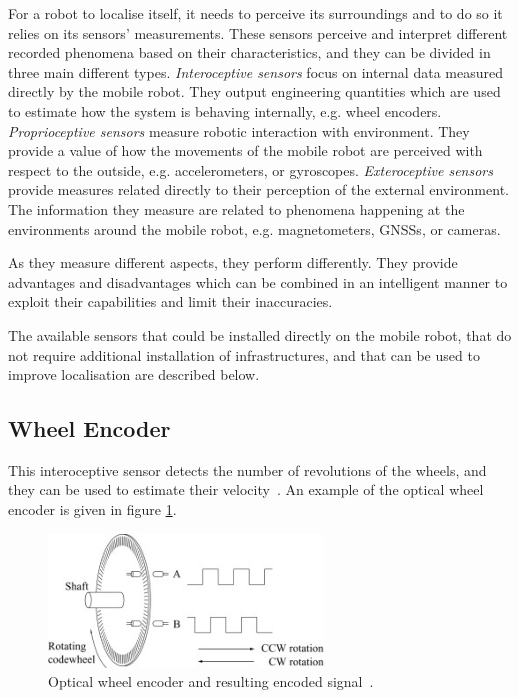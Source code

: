\noindent For a robot to localise itself, it needs to perceive its surroundings and to do so it relies on its sensors' measurements.
These sensors perceive and interpret different recorded phenomena based on their characteristics, and they can be divided in three main different types.
\textit{Interoceptive sensors} focus on internal data measured directly by the mobile robot. They output engineering quantities which are used to estimate how the system is behaving internally, e.g. wheel encoders.
\textit{Proprioceptive sensors} measure robotic interaction with environment. They provide a value of how the movements of the mobile robot are perceived with respect to the outside, e.g. accelerometers, or gyroscopes.
\textit{Exteroceptive sensors} provide measures related directly to their perception of the external environment. The information they measure are related to phenomena happening at the environments around the mobile robot, e.g. magnetometers, \glspl{GNSS}, or cameras.

As they measure different aspects, they perform differently.
They provide advantages and disadvantages which can be combined in an intelligent manner to exploit their capabilities and limit their inaccuracies.

The available sensors that could be installed directly on the mobile robot, that do not require additional installation of infrastructures, and that can be used to improve localisation are described below.

\subsection{Wheel Encoder}

\noindent This interoceptive sensor detects the number of revolutions of the wheels, and they can be used to estimate their velocity~\cite{encoder}. An example of the optical wheel encoder is given in figure \ref{fig:encoder}.
\begin{figure}[!ht]
  \begin{center}
    \includegraphics[width=0.65\textwidth]{Images/2-Background/Enc.jpg}
  \end{center}
  \caption{Optical wheel encoder and resulting encoded signal~\cite{wheelEncoder}.}
  \label{fig:encoder}
\end{figure}

